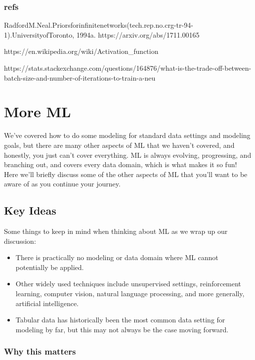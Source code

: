 \documentclass[
  letterpaper,
]{krantz}
\providecommand{\tightlist}{%
  \setlength{\itemsep}{0pt}\setlength{\parskip}{0pt}}\usepackage{longtable,booktabs,array}
\begin{document}
\subsection{refs}\label{refs-1}

RadfordM.Neal.Priorsforinfinitenetworks(tech.rep.no.crg-tr-94-1).UniversityofToronto,
1994a. https://arxiv.org/abs/1711.00165

https://en.wikipedia.org/wiki/Activation\_function

https://stats.stackexchange.com/questions/164876/what-is-the-trade-off-between-batch-size-and-number-of-iterations-to-train-a-neu

\chapter{More ML}\label{sec-ml-more}

We've covered how to do some modeling for standard data settings and
modeling goals, but there are many other aspects of ML that we haven't
covered, and honestly, you just can't cover everything. ML is always
evolving, progressing, and branching out, and covers every data domain,
which is what makes it so fun! Here we'll briefly discuss some of the
other aspects of ML that you'll want to be aware of as you continue your
journey.

\section{Key Ideas}\label{key-ideas-2}

Some things to keep in mind when thinking about ML as we wrap up our
discussion:

\begin{itemize}
\tightlist
\item
  There is practically no modeling or data domain where ML cannot
  potentially be applied.
\item
  Other widely used techniques include unsupervised settings,
  reinforcement learning, computer vision, natural language processing,
  and more generally, artificial intelligence.
\item
  Tabular data has historically been the most common data setting for
  modeling by far, but this may not always be the case moving forward.
\end{itemize}

\subsection{Why this matters}\label{why-this-matters-2}
\end{document}
